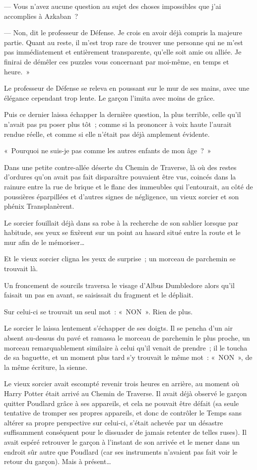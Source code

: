 --- Vous n'avez aucune question au sujet des choses impossibles que j'ai accomplies à Azkaban~?

--- Non, dit le professeur de Défense. Je crois en avoir déjà compris la majeure partie. Quant au reste, il m'est trop rare de trouver une personne qui ne m'est pas immédiatement et entièrement transparente, qu'elle soit amie ou alliée. Je finirai de démêler ces puzzles vous concernant par moi-même, en temps et heure.~»

Le professeur de Défense se releva en poussant sur le mur de ses mains, avec une élégance cependant trop lente. Le garçon l'imita avec moins de grâce.

Puis ce dernier laissa échapper la dernière question, la plus terrible, celle qu'il n'avait pas pu poser plus tôt~; comme si la prononcer à voix haute l'aurait rendue réelle, et comme si elle n'était pas déjà amplement évidente.

«~Pourquoi ne suis-je pas comme les autres enfants de mon âge~?~»

\later

Dans une petite contre-allée déserte du Chemin de Traverse, là où des restes d'ordures qu'on avait pas fait disparaître pouvaient être vus, coincés dans la rainure entre la rue de brique et le flanc des immeubles qui l'entourait, au côté de poussières éparpillées et d'autres signes de négligence, un vieux sorcier et son phénix Transplanèrent.

Le sorcier fouillait déjà dans sa robe à la recherche de son sablier lorsque par habitude, ses yeux se fixèrent sur un point au hasard situé entre la route et le mur afin de le mémoriser…

Et le vieux sorcier cligna les yeux de surprise~; un morceau de parchemin se trouvait là.

Un froncement de sourcils traversa le visage d'Albus Dumbledore alors qu'il faisait un pas en avant, se saisissait du fragment et le dépliait.

Sur celui-ci se trouvait un seul mot~: «~NON~». Rien de plus.

Le sorcier le laissa lentement s'échapper de ses doigts. Il se pencha d'un air absent au-dessus du pavé et ramassa le morceau de parchemin le plus proche, un morceau remarquablement similaire à celui qu'il venait de prendre~; il le toucha de sa baguette, et un moment plus tard s'y trouvait le même mot~: «~NON~», de la même écriture, la sienne.

Le vieux sorcier avait escompté revenir trois heures en arrière, au moment où Harry Potter était arrivé au Chemin de Traverse. Il avait déjà observé le garçon quitter Poudlard grâce à ses appareils, et cela ne pouvait être défait (sa seule tentative de tromper ses propres appareils, et donc de contrôler le Temps sans altérer sa propre perspective sur celui-ci, s'était achevée par un désastre suffisamment conséquent pour le dissuader de jamais retenter de telles ruses). Il avait espéré retrouver le garçon à l'instant de son arrivée et le mener dans un endroit sûr autre que Poudlard (car ses instruments n'avaient pas fait voir le retour du garçon). Mais à présent…

